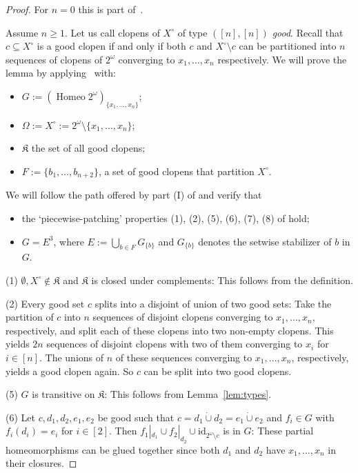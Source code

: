 \documentclass[12pt,a4paper,reqno]{amsart}
\numberwithin{equation}{section}
\theoremstyle{plain}
\theoremstyle{definition}
\newcommand{\id}{\mathrm{id}}
\newcommand{\K}{\mathfrak{K}}
\DeclareMathOperator{\Homeo}{Homeo}
\begin{document}
\begin{proof}
 For $n=0$ this is part of~\cite[Theorem 3.3]{DG:UCPG}.
  
 Assume $n\geq 1$. 
 Let us call clopens of $X^\circ$ of type $([n],[n])$ \emph{good}.
 Recall that $c\subseteq X^\circ$ is a good clopen if and only if both $c$ and $X^\circ \setminus c$ can be partitioned into $n$ sequences of clopens of $2^\omega$ converging to $x_1,\dots,x_n$ respectively.
 We will prove the lemma by applying~\cite[Theorem~2.8]{DG:UCPG} with:
\begin{itemize}
\item  $G := (\Homeo 2^\omega)_{\{x_1,\dots,x_n\}}$;
\item  $\Omega := X^\circ := 2^\omega\setminus\{x_1,\dots,x_n\}$;
\item $\mathfrak{K}$ the set of all good clopens;
 \item
 $F := \{b_1,\dots,b_{n+2}\}$, a set of good clopens that partition $X^\circ$.
\end{itemize}  

We will follow the path offered by part (I) of \cite[Theorem 2.8]{DG:UCPG} and verify that
\begin{itemize}
\item
 the `piecewise-patching' properties (1), (2), (5), (6), (7), (8) of \cite[p. 337]{DG:UCPG} hold;
\item
$G=E^3$, where $E:=\bigcup_{b\in F} G_{\{b\}}$ and $G_{\{b\}}$ denotes the setwise stabilizer of $b$ in $G$.
\end{itemize}

 (1) $\emptyset,X^\circ\not\in\K$ and $\K$ is closed under complements: This follows from the definition.

 (2) Every good set $c$ splits into a disjoint of union of two good sets: Take the partition of $c$ into
 $n$ sequences of disjoint clopens converging to $x_1,\dots,x_n$, respectively, and split each of these clopens
 into two non-empty clopens. This yields $2n$ sequences of disjoint clopens with two of them converging to $x_i$
 for $i\in [n]$. The unions of $n$ of these sequences converging to $x_1,\dots,x_n$, respectively, yields a good
 clopen again. So $c$ can be split into two good clopens.

 (5) $G$ is transitive on $\K$: This follows from Lemma~\ref{lem:types}.

 (6) Let $c,d_1,d_2,e_1,e_2$ be good such that $c=d_1 \dot{\cup} d_2 = e_1 \dot{\cup} e_2$ and
 $f_i\in G$ with $f_i(d_i) = e_i$ for $i\in [2]$. Then $f_1|_{d_1} \cup f_2|_{d_2} \cup \id_{2^\omega\setminus c}$ is in $G$:
 These partial homeomorphisms can be glued together since 
 both $d_1$ and $d_2$ have $x_1,\dots,x_n$ in their closures.
 

\end{proof}
\end{document}
